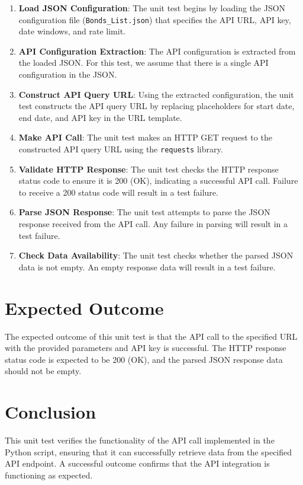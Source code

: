 \documentclass{article}
\begin{document}
\begin{enumerate}
  \item \textbf{Load JSON Configuration}: The unit test begins by loading the JSON configuration file (\texttt{Bonds\_List.json}) that specifies the API URL, API key, date windows, and rate limit.

  \item \textbf{API Configuration Extraction}: The API configuration is extracted from the loaded JSON. For this test, we assume that there is a single API configuration in the JSON\@.

  \item \textbf{Construct API Query URL}: Using the extracted configuration, the unit test constructs the API query URL by replacing placeholders for start date, end date, and API key in the URL template.

  \item \textbf{Make API Call}: The unit test makes an HTTP GET request to the constructed API query URL using the \texttt{requests} library.

  \item \textbf{Validate HTTP Response}: The unit test checks the HTTP response status code to ensure it is 200 (OK), indicating a successful API call.
  Failure to receive a 200 status code will result in a test failure.

  \item \textbf{Parse JSON Response}: The unit test attempts to parse the JSON response received from the API call.
  Any failure in parsing will result in a test failure.

  \item \textbf{Check Data Availability}: The unit test checks whether the parsed JSON data is not empty.
  An empty response data will result in a test failure.

\end{enumerate}

\section{Expected Outcome}\label{sec:expected-outcome}
The expected outcome of this unit test is that the API call to the specified URL with the provided parameters and API key is successful.
The HTTP response status code is expected to be 200 (OK), and the parsed JSON response data should not be empty.

\section{Conclusion}\label{sec:conclusion}
This unit test verifies the functionality of the API call implemented in the Python script, ensuring that it can successfully retrieve data from the specified API endpoint.
A successful outcome confirms that the API integration is functioning as expected.
\end{document}
